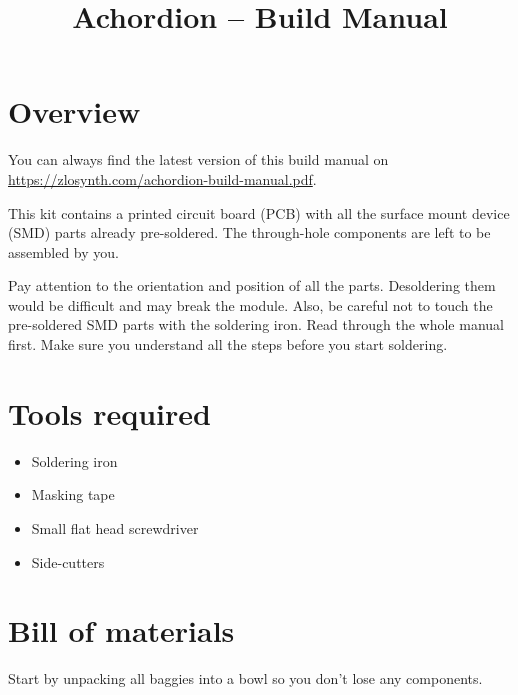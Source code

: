 \documentclass[10pt,a4paper,twocolumn]{article}
\begin{document}
\title{Achordion -- Build Manual}
\author{}
\date{}

\maketitle

\section{Overview}

You can always find the latest version of this build manual on \url{https://zlosynth.com/achordion-build-manual.pdf}.

This kit contains a printed circuit board (PCB) with all the surface mount device (SMD) parts already pre-soldered. The through-hole components are left to be assembled by you.

Pay attention to the orientation and position of all the parts. Desoldering them would be difficult and may break the module. Also, be careful not to touch the pre-soldered SMD parts with the soldering iron. Read through the whole manual first. Make sure you understand all the steps before you start soldering.

\newpage

\section{Tools required}

\begin{itemize}
  \item Soldering iron
  \item Masking tape
  \item Small flat head screwdriver
  \item Side-cutters
\end{itemize}

\newpage

\section{Bill of materials}

Start by unpacking all baggies into a bowl so you don't lose any components.
\end{document}
